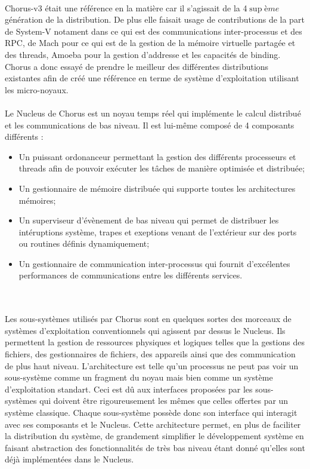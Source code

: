 \documentclass[a4paper, 12pt]{article}
\begin{document}
\paragraph{}
Chorus-v3 était une référence en la matière car il s'agissait de la 4$\sup{ème}$ génération de la distribution. De plus elle faisait usage de contributions de la part de System-V notament dans ce qui est des communications inter-processus et des RPC, de Mach pour ce qui est de la gestion de la mémoire virtuelle partagée et des threads, Amoeba pour la gestion d'addresse et les capacités de binding. Chorus a donc essayé de prendre le meilleur des différentes distributions existantes afin de créé une référence en terme de système d'exploitation utilisant les micro-noyaux.
\\
\paragraph{}
Le Nucleus de Chorus est un noyau temps réel qui implémente le calcul distribué et les communications de bas niveau. Il est lui-même composé de 4 composants différents :
\begin{itemize}
	\item Un puissant ordonanceur permettant la gestion des différents processeurs et threads afin de pouvoir exécuter les tâches de manière optimisée et distribuée;
	\item Un gestionnaire de mémoire distribuée qui supporte toutes les architectures mémoires;
	\item Un superviseur d'évènement de bas niveau qui permet de distribuer les intéruptions système, trapes et exeptions venant de l'extérieur sur des ports ou routines définis dynamiquement;
	\item Un gestionnaire de communication inter-processus qui fournit d'excélentes performances de communications entre les différents services.
\end{itemize}
\\
\paragraph{}
Les sous-systèmes utilisés par Chorus sont en quelques sortes des morceaux de systèmes d'exploitation conventionnels qui agissent par dessus le Nucleus. Ils permettent la gestion de ressources physiques et logiques telles que la gestions des fichiers, des gestionnaires de fichiers, des appareils ainsi que des communication de plus haut niveau. L'architecture est telle qu'un processus ne peut pas voir un sous-système comme un fragment du noyau mais bien comme un système d'exploitation standart. Ceci est dû aux interfaces proposées par les sous-systèmes qui doivent être rigoureusement les mêmes que celles offertes par un système classique. Chaque sous-système possède donc son interface qui interagit avec ses composants et le Nucleus. Cette architecture permet, en plus de faciliter la distribution du système, de grandement simplifier le développement système en faisant abstraction des fonctionnalités de très bas niveau étant donné qu'elles sont déjà implémentées dans le Nucleus.
\end{document}
